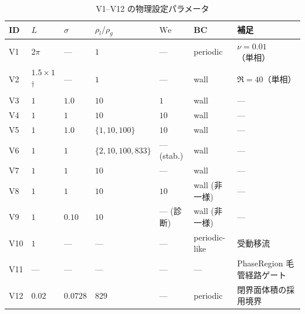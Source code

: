 \begin{table}[!ht]
\caption{V1--V12 の物理設定パラメータ}
\label{tab:V_settings}
\centering\small
\begin{tabular}{l l l l l l l}
\toprule
ID & $L$ & $\sigma$ & $\rho_l/\rho_g$ & $\mathrm{We}$ & BC & 補足 \\
\midrule
V1  & $2\pi$ & ---   & $1$              & ---           & periodic       & $\nu=0.01$（単相） \\
V2  & $1.5\!\times\!1$\textsuperscript{$\dagger$} & --- & $1$ & --- & wall & $\Re=40$（単相）  \\
V3  & $1$ & $1.0$ & $10$              & $1$           & wall           & --- \\
V4  & $1$ & $1$   & $10$              & $10$          & wall           & --- \\
V5  & $1$ & $1.0$ & $\{1,10,100\}$    & $10$          & wall           & --- \\
V6  & $1$ & $1$   & $\{2,10,100,833\}$& --- (stab.)   & wall           & --- \\
V7  & $1$ & $1$   & $10$              & ---           & wall           & --- \\
V8  & $1$ & $1$   & $10$              & $10$          & wall (非一様)   & --- \\
V9  & $1$ & $0.10$& $10$              & --- (診断)   & wall (非一様)   & --- \\
V10 & $1$ & ---   & ---               & ---           & periodic-like  & 受動移流 \\
V11 & --- & ---   & ---               & ---           & ---            & PhaseRegion 毛管経路ゲート \\
V12 & $0.02$ & $0.0728$ & $829$      & ---           & periodic       & 閉界面体積の採用境界 \\
\bottomrule
\end{tabular}
\end{table}

